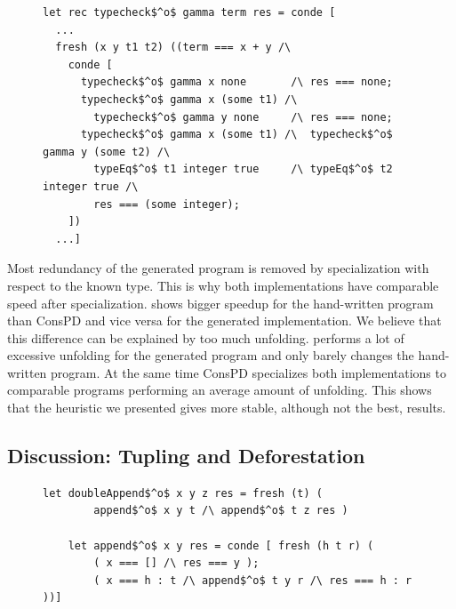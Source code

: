 \begin{figure}[!t]
  \centering
    \begin{lstlisting}[label={type:gen}, caption={A fragment of the generated typechecker}, captionpos=b, frame=tb]
let rec typecheck$^o$ gamma term res = conde [
  ...
  fresh (x y t1 t2) ((term === x + y /\
    conde [
      typecheck$^o$ gamma x none       /\ res === none;
      typecheck$^o$ gamma x (some t1) /\
        typecheck$^o$ gamma y none     /\ res === none;
      typecheck$^o$ gamma x (some t1) /\  typecheck$^o$ gamma y (some t2) /\
        typeEq$^o$ t1 integer true     /\ typeEq$^o$ t2 integer true /\
        res === (some integer);
    ])
  ...]
    \end{lstlisting}
\end{figure}

Most redundancy of the generated program is removed by specialization with respect to the known type.
This is why both implementations have comparable speed after specialization.
\ecce shows bigger speedup for the hand-written program than ConsPD and vice versa for the generated implementation.
We believe that this difference can be explained by too much unfolding.
\ecce performs a lot of excessive unfolding for the generated program and only barely changes the hand-written program.
At the same time ConsPD specializes both implementations to comparable programs performing an average amount of unfolding.
This shows that the heuristic we presented gives more stable, although not the best, results.


\subsection{Discussion: Tupling and Deforestation}
\label{discussion}


\begin{figure}[!t]
  \centering
  \begin{minipage}{0.7\textwidth}
    \begin{lstlisting}[label={doubleApp}, caption={Inefficient implementation of concatenation of three lists}, captionpos=b, frame=tb]
    let doubleAppend$^o$ x y z res = fresh (t) (
        append$^o$ x y t /\ append$^o$ t z res )

    let append$^o$ x y res = conde [ fresh (h t r) (
        ( x === [] /\ res === y );
        ( x === h : t /\ append$^o$ t y r /\ res === h : r ))]
    \end{lstlisting}
  \end{minipage}
\end{figure}

